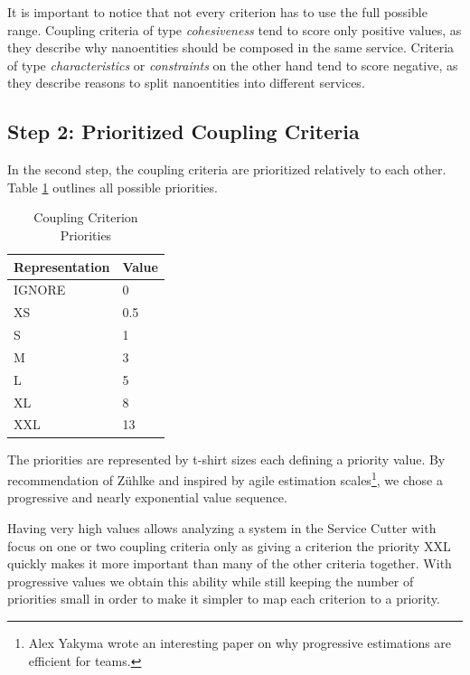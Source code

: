It is important to notice that not every criterion has to use the full possible range. Coupling criteria of type \textit{cohesiveness} tend to score only positive values, as they describe why nanoentities should be composed in the same service. Criteria of type \textit{characteristics} or \textit{constraints} on the other hand tend to score negative, as they describe reasons to split nanoentities into different services.

\subsection{Step 2: Prioritized Coupling Criteria}

In the second step, the coupling criteria are prioritized relatively to each other. Table \ref{tab:priorities} outlines all possible priorities.

\begin{table}[H]
	\centering
	\caption{Coupling Criterion Priorities}
	\label{tab:priorities}
	\begin{tabular}{|p{70pt}|p{30pt}|}
		\hline	
		Representation & Value  \\
		\hline
		IGNORE & 0  \\
		\hline
		XS & 0.5  \\
		\hline
		S & 1  \\
		\hline
		M & 3  \\
		\hline
		L & 5  \\
		\hline
		XL & 8  \\
		\hline
		XXL & 13  \\
		\hline
	\end{tabular}
\end{table}

The priorities are represented by t-shirt sizes each defining a priority value. By recommendation of Zühlke and inspired by agile estimation scales\footnote{Alex Yakyma wrote an interesting paper on why progressive estimations are efficient for teams\cite{estimation}.}, we chose a progressive and nearly exponential value sequence. 

Having very high values allows analyzing a system in the Service Cutter with focus on one or two coupling criteria only as giving a criterion the priority XXL quickly makes it more important than many of the other criteria together. With progressive values we obtain this ability while still keeping the number of priorities small in order to make it simpler to map each criterion to a priority. 

